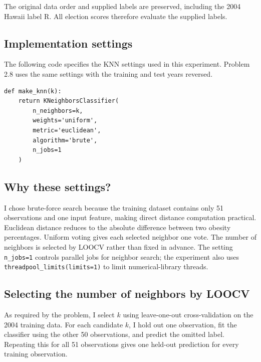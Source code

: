 \documentclass[11pt,a4paper]{article}
\begin{document}
The original data order and supplied labels are preserved, including the 2004 Hawaii label R. All election scores therefore evaluate the supplied labels.

\par\addvspace{6pt}
\noindent\begin{minipage}{\linewidth}
\subsection*{Implementation settings}
The following code specifies the KNN settings used in this experiment. Problem 2.8 uses the same settings with the training and test years reversed.

\begin{lstlisting}[style=pythoncode,caption={KNN configuration used in the experiments.}]
def make_knn(k):
    return KNeighborsClassifier(
        n_neighbors=k,
        weights='uniform',
        metric='euclidean',
        algorithm='brute',
        n_jobs=1
    )
\end{lstlisting}

\subsection*{Why these settings?}
I chose brute-force search because the training dataset contains only 51 observations and one input feature, making direct distance computation practical. Euclidean distance reduces to the absolute difference between two obesity percentages. Uniform voting gives each selected neighbor one vote. The number of neighbors is selected by LOOCV rather than fixed in advance. The setting \texttt{n\_jobs=1} controls parallel jobs for neighbor search; the experiment also uses \texttt{threadpool\_limits(limits=1)} to limit numerical-library threads.
\end{minipage}\par\addvspace{6pt}

\subsection*{Selecting the number of neighbors by LOOCV}
As required by the problem, I select $k$ using leave-one-out cross-validation on the 2004 training data. For each candidate $k$, I hold out one observation, fit the classifier using the other 50 observations, and predict the omitted label. Repeating this for all 51 observations gives one held-out prediction for every training observation.
\end{document}
